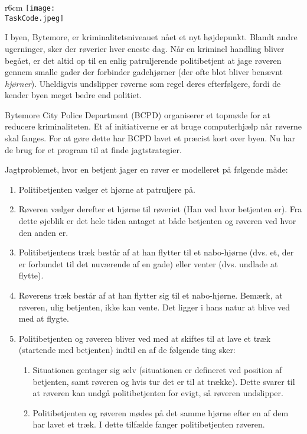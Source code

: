 \documentclass{boi2014-dk}
\renewcommand{\TaskCode}{coprobber}
\begin{document}
    \begin{wrapfigure}[8]{r}{6cm}
        \vspace{-24pt}
		\texttt{[image: \\TaskCode.jpeg]}
	\end{wrapfigure}

	I byen, Bytemore, er kriminalitetsniveauet nået et nyt højdepunkt.
	Blandt andre ugerninger, sker der røverier hver eneste dag.
	Når en kriminel handling bliver begået, er det altid op til
	en enlig patruljerende politibetjent at jage røveren gennem
	smalle gader der forbinder gadehjørner (der ofte blot bliver
	benævnt \emph{hjørner}). Uheldigvis undslipper røverne som regel
	deres efterfølgere, fordi de kender byen meget bedre end politiet.

	Bytemore City Police Department (BCPD) organiserer et topmøde
	for at reducere kriminaliteten. Et af initiativerne er at bruge
	computerhjælp når røverne skal fanges. For at gøre dette har
	BCPD lavet et præcist kort over byen. Nu har de brug for et
	program til at finde jagtstrategier.

	Jagtproblemet, hvor en betjent jager en røver er modelleret på
	følgende måde:
    \begin{enumerate}
    	\item Politibetjenten vælger et hjørne at patruljere på.
    	\item Røveren vælger derefter et hjørne til røveriet
    		  (Han ved hvor betjenten er). Fra dette øjeblik
    		  er det hele tiden antaget at både betjenten og
    		  røveren ved hvor den anden er.
    	\item Politibetjentens træk består af at han flytter til
    		  et nabo-hjørne (dvs. et, der er forbundet til det
    		  nuværende af en gade) eller venter (dvs. undlade
    		  at flytte).
    	\item Røverens træk består af at han flytter sig til et
    		  nabo-hjørne. Bemærk, at røveren, ulig betjenten,
    		  ikke kan vente. Det ligger i hans natur at blive
    		  ved med at flygte.
    	\item Politibetjenten og røveren bliver ved med at skiftes
    		  til at lave et træk (startende med betjenten) indtil
    		  en af de følgende ting sker:
        \begin{enumerate}
        	\item Situationen gentager sig selv (situationen er
        		  defineret ved position af betjenten, samt røveren
        		  og hvis tur det er til at trække). Dette svarer
        		  til at røveren kan undgå politibetjenten for
        		  evigt, så røveren undslipper.
        	\item Politibetjenten og røveren mødes på det samme
        		  hjørne efter en af dem har lavet et træk. I dette
        		  tilfælde fanger politibetjenten røveren.
        \end{enumerate}
    \end{enumerate}
\end{document}
